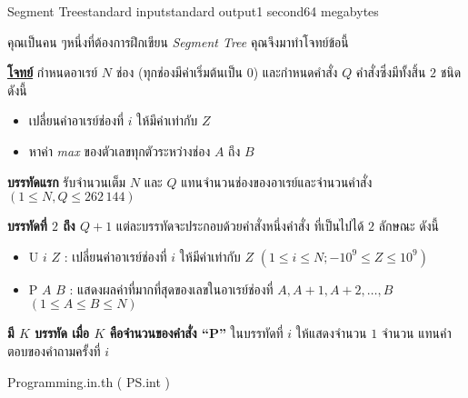 \documentclass[11pt,a4paper]{article}
\begin{document}
\begin{problem}{Segment Tree}{standard input}{standard output}{1 second}{64 megabytes}

คุณเป็นคน ๆหนึ่งที่ต้องการฝึกเขียน \textit{Segment Tree} คุณจึงมาทำโจทย์ข้อนี้


\bigskip
\underline{\textbf{โจทย์}}  กำหนดอาเรย์ $N$ ช่อง (ทุกช่องมีค่าเริ่มต้นเป็น $0$) และกำหนดคำสั่ง $Q$ คำสั่งซึ่งมีทั้งสิ้น $2$ ชนิด ดังนี้
\begin{itemize}

\item เปลี่ยนค่าอาเรย์ช่องที่ $i$ ให้มีค่าเท่ากับ $Z$
\item หาค่า \textit{max} ของตัวเลขทุกตัวระหว่างช่อง $A$ ถึง $B$

\end{itemize}
\InputFile

\textbf{บรรทัดแรก} รับจำนวนเต็ม $N$ และ $Q$ แทนจำนวนช่องของอาเรย์และจำนวนคำสั่ง $(1 \leq N, Q \leq 262\,144)$

\textbf{บรรทัดที่ $2$ ถึง $Q+1$ }แต่ละบรรทัดจะประกอบด้วยคำสั่งหนึ่งคำสั่ง ที่เป็นไปได้ $2$ ลักษณะ ดังนี้
\begin{itemize}

\item U $i$ $Z$ : เปลี่ยนค่าอาเรย์ช่องที่ $i$ ให้มีค่าเท่ากับ $Z$ $(1 \leq i \leq N;  -10^9 \leq Z \leq 10^9)$
\item P $A$ $B$ : แสดงผลค่าที่มากที่สุดของเลขในอาเรย์ช่องที่ $A, A+1, A+2, … , B$ $(1 \leq A \leq B \leq N)$


\end{itemize}
\OutputFile

\textbf{มี $K$ บรรทัด เมื่อ $K$ คือจำนวนของคำสั่ง “P”} ในบรรทัดที่ $i$ ให้แสดงจำนวน $1$ จำนวน แทนคำตอบของคำถามครั้งที่ $i$

\Examples

\begin{example}
%
%
\end{example}


\Source

Programming.in.th ( PS.int )

\end{problem}
\end{document}
